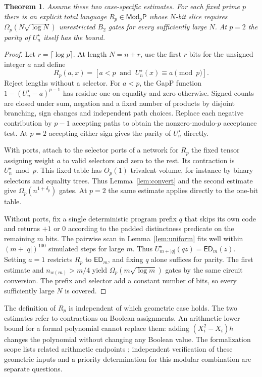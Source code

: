 \documentclass[11pt]{article}
\newtheorem{theorem}{Theorem}[section]
\theoremstyle{definition}
\theoremstyle{remark}
\newcommand{\ED}{\mathsf{ED}}
\begin{document}
\begin{theorem}\label{thm:modular}
Assume these two case-specific estimates. For each fixed prime $p$
there is an explicit total language $R_p\in\mathsf{Mod}_p\mathsf P$
whose $N$-bit slice requires $\Omega_p(N\sqrt{\log N})$ unrestricted
$B_2$ gates for every sufficiently large $N$. At $p=2$ the parity
of $U_n^\star$ itself has the bound.
\end{theorem}
\begin{proof}
Let $r=\lceil\log p\rceil$. At length $N=n+r$, use the first $r$
bits for the unsigned integer $a$ and define
\[
 R_p(a,x)=[a<p\ \text{ and }\ U_n^\star(x)\equiv a\pmod p].
\]
Reject lengths without a selector. For $a<p$, the GapP function
$1-(U_n^\star-a)^{p-1}$ has residue one on equality and zero
otherwise. Signed counts are closed under sum, negation and a fixed
number of products by disjoint branching, sign changes and independent
path choices. Replace each negative contribution by $p-1$ accepting
paths to obtain the nonzero-modulo-$p$ acceptance test. At $p=2$
accepting either sign gives the parity of $U_n^\star$ directly.

With ports, attach to the selector ports of a network for $R_p$ the
fixed tensor assigning weight $a$ to valid selectors and zero to the
rest. Its contraction is $U_n^\star\bmod p$. This fixed table has
$O_p(1)$ trivalent volume, for instance by binary selectors and
equality trees. Thus Lemma~\ref{lem:convert} and the second estimate
give $\Omega_p(n^{1+\delta_p})$ gates. At $p=2$ the same estimate
applies directly to the one-bit table.

Without ports, fix a single deterministic program prefix $q$ that
skips its own code and returns $+1$ or $0$ according to the padded
distinctness predicate on the remaining $m$ bits. The pairwise scan in
Lemma~\ref{lem:uniform} fits well within $(m+|q|)^{100}$ simulated
steps for large $m$. Thus $U_{m+|q|}^\star(qz)=\ED_m(z)$.
Setting $a=1$ restricts $R_p$ to $\ED_m$, and fixing $q$ alone
suffices for parity. The first estimate and $n_{w(m)}>m/4$ yield
$\Omega_p(m\sqrt{\log m})$ gates by the same circuit conversion.
The prefix and selector add a constant number of bits, so every
sufficiently large $N$ is covered.
\end{proof}
The definition of $R_p$ is independent of which geometric case holds.
The two estimates refer to contractions on Boolean assignments. An
arithmetic lower bound for a formal polynomial cannot replace them:
adding $(X_i^2-X_i)h$ changes the polynomial without changing any
Boolean value. The formalization scope lists related arithmetic
endpoints \cite{scope}; independent verification of these geometric
inputs and a priority determination for this modular combination
are separate questions.
\end{document}
